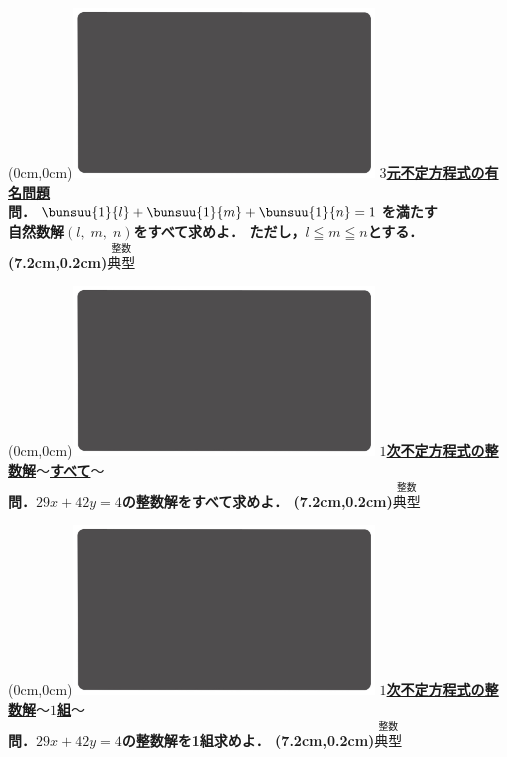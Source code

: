 \documentclass[10pt,
fleqn,
dvipdfmx,
uplatex
]{jsarticle}
\begin{document}
\newpage



\at(0cm,0cm){\includegraphics[width=8cm,bb=0 0 1920 1080]{./media_local/smart_background/整数.jpeg}}
{\color{orange}\bf\boldmath\Large\underline{$3$元不定方程式の有名問題}}\vspace{0.3zw}\\
\Large 
\bf\boldmath 問．$\bunsuu{1}{l}+\bunsuu{1}{m}+\bunsuu{1}{n}=1$を満たす\vspace{0.3zw}\\
自然数解$\left(l,\;m,\;n\right)$をすべて求めよ．
ただし，$l\leqq m\leqq n$とする．
\at(7.2cm,0.2cm){\small\color{bradorange}$\overset{\text{整数}}{\text{典型}}$}


\newpage



\at(0cm,0cm){\includegraphics[width=8cm,bb=0 0 1920 1080]{./media_local/smart_background/整数.jpeg}}
{\color{orange}\bf\boldmath\large\underline{$1$次不定方程式の整数解$〜$すべて$〜$}}\vspace{0.3zw}\\
\huge 
\bf\boldmath 問．${29}x+{42}y=4$の整数解をすべて求めよ．
\at(7.2cm,0.2cm){\small\color{bradorange}$\overset{\text{整数}}{\text{典型}}$}


\newpage



\at(0cm,0cm){\includegraphics[width=8cm,bb=0 0 1920 1080]{./media_local/smart_background/整数.jpeg}}
{\color{orange}\bf\boldmath\large\underline{$1$次不定方程式の整数解$〜1$組$〜$}}\vspace{0.3zw}\\
\huge 
\bf\boldmath 問．${29}x+{42}y=4$の整数解を1組求めよ．
\at(7.2cm,0.2cm){\small\color{bradorange}$\overset{\text{整数}}{\text{典型}}$}
\end{document}
